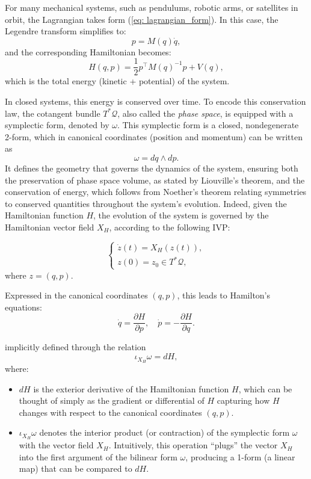 \documentclass{article}
\theoremstyle{plain}
\theoremstyle{definition}
\theoremstyle{remark}
\begin{document}
For many mechanical systems, such as pendulums, robotic arms, or satellites in orbit, the Lagrangian takes form (\ref{eq: lagrangian_form}). In this case, the Legendre transform simplifies to:
\begin{equation}
    p = M(q) \dot{q},
\end{equation}
and the corresponding Hamiltonian becomes:
\begin{equation}
    H(q, p) = \frac{1}{2} p^\top M(q)^{-1} p + V(q),
\end{equation}
which is the total energy (kinetic + potential) of the system.

In closed systems, this energy is conserved over time.  
To encode this conservation law, the cotangent bundle $T^*\mathcal{Q}$, also called the \emph{phase space}, is equipped with a symplectic form, denoted by $\omega$.  
This symplectic form is a closed, nondegenerate 2-form, which in canonical coordinates (position and momentum) can be written as
\[
\omega = dq \wedge dp.
\]
It defines the geometry that governs the dynamics of the system, ensuring both the preservation of phase space volume, as stated by Liouville’s theorem, and the conservation of energy, which follows from Noether’s theorem relating symmetries to conserved quantities throughout the system’s evolution. Indeed, given the Hamiltonian function $H$, the evolution of the system is governed by the Hamiltonian vector field $X_H$, according to the following IVP:

\begin{equation}
\label{eq: full-order-model}
    \begin{cases}
        \dot{z}(t) = X_H(z(t)), \\
        z(0) = z_0 \in T^*\mathcal{Q},
    \end{cases}
\end{equation}
where $z = (q, p)$.

Expressed in the canonical coordinates $(q, p)$, this leads to Hamilton’s equations:
\begin{equation}
    \label{eq: hamilton_equations}
    \dot{q} = \frac{\partial H}{\partial p}, \quad \dot{p} = - \frac{\partial H}{\partial q}.
\end{equation}

\iffalse

implicitly defined through the relation
\begin{equation*}
    \iota_{X_H} \omega = dH,
\end{equation*}
where:
\begin{itemize}
    \item $dH$ is the exterior derivative of the Hamiltonian function $H$, which can be thought of simply as the gradient or differential of $H$ capturing how $H$ changes with respect to the canonical coordinates $(q, p)$.
    \item $\iota_{X_H}\omega$ denotes the interior product (or contraction) of the symplectic form $\omega$ with the vector field $X_H$. Intuitively, this operation “plugs” the vector $X_H$ into the first argument of the bilinear form $\omega$, producing a 1-form (a linear map) that can be compared to $dH$.
\end{itemize}
\end{document}
